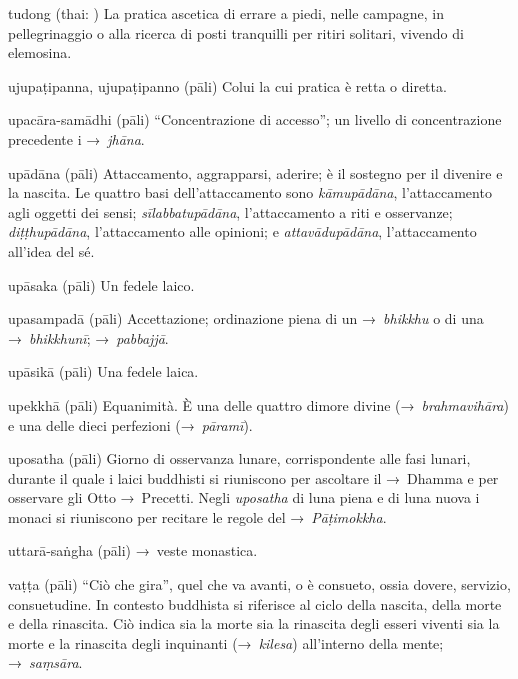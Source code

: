 \begin{glossarydescription}
\item[tudong] (thai: ) La pratica ascetica di errare a piedi, nelle
  campagne, in pellegrinaggio o alla ricerca di posti tranquilli per ritiri
  solitari, vivendo di elemosina.


\item[ujupaṭipanna, ujupaṭipanno] (pāli) Colui la cui pratica è retta o diretta.

\item[upacāra-samādhi] (pāli) ``Concentrazione di accesso''; un livello di
  concentrazione precedente i →~\emph{jhāna}.

\item[upādāna] (pāli)\label{glossary-upadana} Attaccamento, aggrapparsi, aderire; è il sostegno per il
  divenire e la nascita. Le quattro basi dell'attaccamento sono
  \emph{kāmupādāna}, l'attaccamento agli oggetti dei sensi;
  \emph{sīlabbatupādāna}, l'attaccamento a riti e osservanze;
  \emph{diṭṭhupādāna}, l'attaccamento alle opinioni; e \emph{attavādupādāna},
  l'attaccamento all'idea del sé.

\item[upāsaka] (pāli) Un fedele laico.

\item[upasampadā] (pāli) Accettazione; ordinazione piena di un →~\emph{bhikkhu}
  o di una →~\emph{bhikkhunī}; →~\emph{pabbajjā}.

\item[upāsikā] (pāli) Una fedele laica.

\item[upekkhā] (pāli) Equanimità. È una delle quattro dimore divine
  (→~\emph{brahmavihāra}) e una delle dieci perfezioni (→~\emph{pāramī}).

\item[uposatha] (pāli) Giorno di osservanza lunare, corrispondente alle fasi
  lunari, durante il quale i laici buddhisti si riuniscono per ascoltare il
  →~Dhamma e per osservare gli Otto →~Precetti. Negli \emph{uposatha} di luna
  piena e di luna nuova i monaci si riuniscono per recitare le regole del
  →~\emph{Pāṭimokkha}.

\item[uttarā-saṅgha] (pāli) →~veste monastica.


\item[vaṭṭa] (pāli) ``Ciò che gira'', quel che va avanti, o è consueto, ossia
  dovere, servizio, consuetudine. In contesto buddhista si riferisce al ciclo
  della nascita, della morte e della rinascita. Ciò indica sia la morte sia la
  rinascita degli esseri viventi sia la morte e la rinascita degli inquinanti
  (→~\emph{kilesa}) all'interno della mente; →~\emph{saṃsāra}.


\end{glossarydescription}
